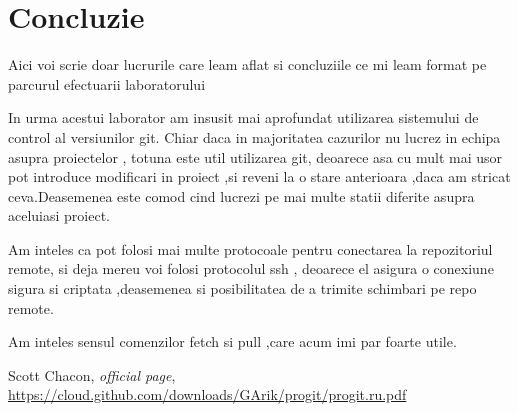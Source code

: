 \documentclass[a4paper, 12pt]{article}
\begin{document}
\newpage
\section{Concluzie}
Aici voi scrie doar lucrurile care leam aflat si concluziile ce mi leam format pe parcurul efectuarii laboratorului

In urma acestui laborator am insusit mai aprofundat utilizarea sistemului de control al versiunilor git.
Chiar daca in majoritatea cazurilor nu lucrez in echipa asupra proiectelor , totuna este util utilizarea git, deoarece asa cu mult mai usor pot introduce modificari in proiect ,si reveni la o stare anterioara ,daca am stricat ceva.Deasemenea este comod cind lucrezi pe mai multe statii diferite asupra aceluiasi proiect.

Am inteles ca pot folosi mai multe protocoale pentru conectarea la repozitoriul remote, si deja mereu voi folosi protocolul ssh , deoarece el asigura o conexiune sigura si criptata ,deasemenea si posibilitatea de a trimite schimbari pe repo remote.

Am  inteles sensul comenzilor fetch si pull ,care acum imi par foarte utile.
\clearpage

\begin{thebibliography}{1}


 Scott Chacon, \textit{ official page}, \url{https://cloud.github.com/downloads/GArik/progit/progit.ru.pdf}



\end{thebibliography}
\end{document}
